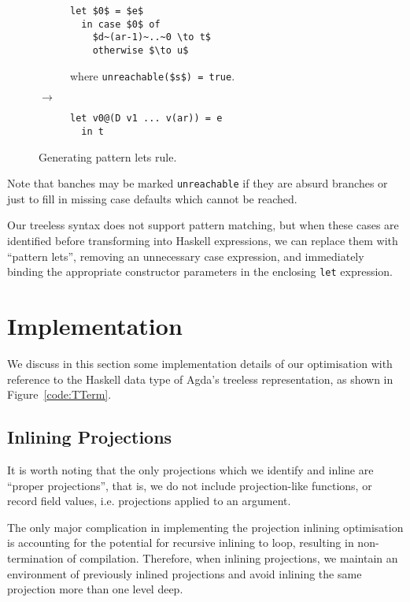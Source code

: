 \begin{figure}[h]
\centering
\begin{subfigure}{.47\textwidth}
  \begin{lstlisting}[style=math]
  let $0$ = $e$
  in case $0$ of
    $d~(ar-1)~..~0 \to t$
    otherwise $\to u$
  \end{lstlisting}
  where \lstinline[style=math]{unreachable($s$) = true}.
\end{subfigure}
{\large$\to$}
\begin{subfigure}{.47\textwidth}
  \begin{lstlisting}[style=blockhaskell]
  let v0@(D v1 ... v(ar)) = e
  in t
  \end{lstlisting}
\end{subfigure}
\caption{Generating pattern lets rule.}
\label{fig:plet_rule}
\end{figure}

Note that banches may be marked \lstinline{unreachable} if they are absurd branches or just to fill in missing case defaults which cannot be reached.

Our treeless syntax does not support pattern matching, but when these cases are identified before transforming into Haskell expressions, we can replace them with ``pattern lets'', removing an unnecessary case expression, and immediately binding the appropriate constructor parameters in the enclosing \lstinline{let} expression.

\section{Implementation}
\label{sec:implementation}

We discuss in this section some implementation details of our optimisation with reference to the Haskell data type of Agda's treeless representation, as shown in Figure~\ref{code:TTerm}.

\subsection{Inlining Projections}

It is worth noting that the only projections which we identify and inline are ``proper projections'', that is, we do not include projection-like functions, or record field values, i.e. projections applied to an argument.

The only major complication in implementing the projection inlining optimisation is accounting for the potential for recursive inlining to loop, resulting in non-termination of compilation. Therefore, when inlining projections, we maintain an environment of previously inlined projections and avoid inlining the same projection more than one level deep.

